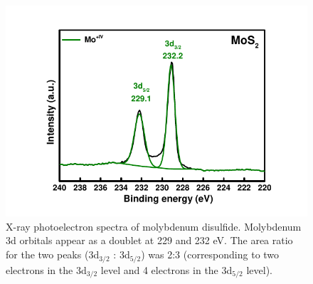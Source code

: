 \begin{figure}[tbh!]
\centering
\includegraphics[width=\textwidth]{Figures/chap2fig/XPS.pdf}
\caption{X-ray photoelectron spectra of molybdenum disulfide. Molybdenum 3d orbitals appear as a doublet at 229 and 232 eV. The area ratio for the two peaks (3d$_{3/2}$ : 3d$_{5/2}$) was 2:3 (corresponding to two electrons in the 3d$_{3/2}$ level and 4 electrons in the 3d$_{5/2}$ level).}
\label{Figures/chap2fig:XPS}
\end{figure}




